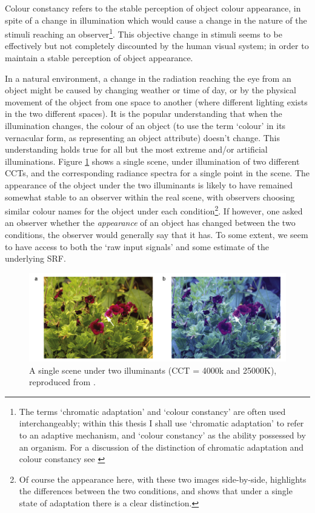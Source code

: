 Colour constancy refers to the stable perception of object colour appearance, in spite of a change in illumination which would cause a change in the nature of the stimuli reaching an observer\footnote{The terms `chromatic adaptation' and `colour constancy' are often used interchangeably; within this thesis I shall use `chromatic adaptation' to refer to an adaptive mechanism, and `colour constancy' as the ability possessed by an organism. For a discussion of the distinction of chromatic adaptation and colour constancy see \citet{brill_chromatic_1986}}. This objective change in stimuli seems to be effectively but not completely discounted by the human visual system; in order to maintain a stable perception of object appearance. 

In a natural environment, a change in the radiation reaching the eye from an object might be caused by changing weather or time of day, or by the physical movement of the object from one space to another (where different lighting exists in the two different spaces). It is the popular understanding that when the illumination changes, the colour of an object (to use the term `colour' in its vernacular form, as representing an object attribute) doesn't change. This understanding holds true for all but the most extreme and/or artificial illuminations. Figure \ref{fig:fosterflowers} shows a single scene, under illumination of two different \glspl{CCT}, and the corresponding radiance spectra for a single point in the scene. The appearance of the object under the two illuminants is likely to have remained somewhat stable to an observer within the real scene, with observers choosing similar colour names for the object under each condition\footnote{Of course the appearance here, with these two images side-by-side, highlights the differences between the two conditions, and shows that under a single state of adaptation there is a clear distinction.}. If however, one asked an observer whether the \emph{appearance} of an object has changed between the two conditions, the observer would generally say that it has. To some extent, we seem to have access to both the `raw input signals' and some estimate of the underlying \gls{SRF}.

\begin{figure}[htbp]
\includegraphics[max width=\textwidth]{figs/LitRev/fosterflowers.png}
\caption{A single scene under two illuminants (\Gls{CCT} = 4000k and 25000K), reproduced from \citet{foster_color_2011}.}
\label{fig:fosterflowers}
\end{figure}

